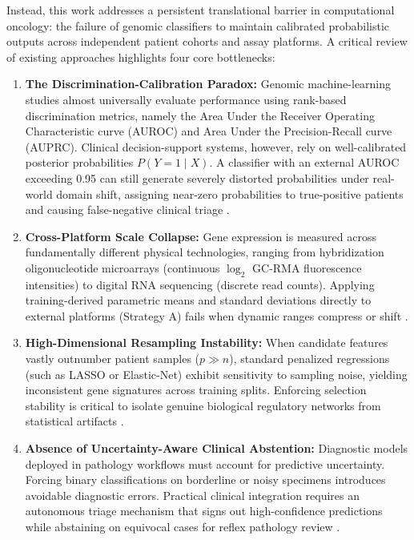 \documentclass[11pt,a4paper]{article}
\begin{document}
Instead, this work addresses a persistent translational barrier in computational oncology: the failure of genomic classifiers to maintain calibrated probabilistic outputs across independent patient cohorts and assay platforms. A critical review of existing approaches highlights four core bottlenecks:

\begin{enumerate}
    \item \textbf{The Discrimination-Calibration Paradox:} Genomic machine-learning studies almost universally evaluate performance using rank-based discrimination metrics, namely the Area Under the Receiver Operating Characteristic curve (AUROC) and Area Under the Precision-Recall curve (AUPRC). Clinical decision-support systems, however, rely on well-calibrated posterior probabilities $P(Y=1 \mid X)$. A classifier with an external AUROC exceeding 0.95 can still generate severely distorted probabilities under real-world domain shift, assigning near-zero probabilities to true-positive patients and causing false-negative clinical triage \cite{r7,r8}.
    \item \textbf{Cross-Platform Scale Collapse:} Gene expression is measured across fundamentally different physical technologies, ranging from hybridization oligonucleotide microarrays (continuous $\log_2$ GC-RMA fluorescence intensities) to digital RNA sequencing (discrete read counts). Applying training-derived parametric means and standard deviations directly to external platforms (Strategy A) fails when dynamic ranges compress or shift \cite{r9}.
    \item \textbf{High-Dimensional Resampling Instability:} When candidate features vastly outnumber patient samples ($p \gg n$), standard penalized regressions (such as LASSO or Elastic-Net) exhibit sensitivity to sampling noise, yielding inconsistent gene signatures across training splits. Enforcing selection stability is critical to isolate genuine biological regulatory networks from statistical artifacts \cite{r10}.
    \item \textbf{Absence of Uncertainty-Aware Clinical Abstention:} Diagnostic models deployed in pathology workflows must account for predictive uncertainty. Forcing binary classifications on borderline or noisy specimens introduces avoidable diagnostic errors. Practical clinical integration requires an autonomous triage mechanism that signs out high-confidence predictions while abstaining on equivocal cases for reflex pathology review \cite{r11}.
\end{enumerate}
\end{document}
